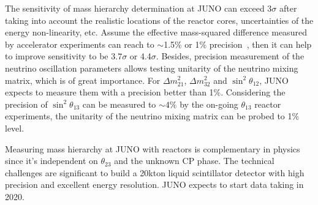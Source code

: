 The sensitivity of mass hierarchy determination at JUNO can exceed 3$\sigma$ after taking into account the realistic locations of the reactor cores, uncertainties of the energy non-linearity, etc. Assume the effective mass-squared difference measured by accelerator experiments can reach to $\sim$1.5\% or 1\% precision~\cite{Agarwalla}, then it can help to improve sensitivity to be 3.7$\sigma$ or 4.4$\sigma$\cite{Li-PRD13}. Besides, precision measurement of the neutrino oscillation parameters allows testing unitarity of the neutrino mixing matrix, which is of great importance. For $\Delta m^2_{21}$, $\Delta m^2_{32}$ and $\sin^2\theta_{12}$, JUNO expects to measure them with a precision better than 1\%. Considering the precision of $\sin^2\theta_{13}$ can be measured to $\sim4\%$ by the on-going $\theta_{13}$ reactor experiments, the unitarity of the neutrino mixing matrix can be probed to 1\% level.

Measuring mass hierarchy at JUNO with reactors is complementary in physics since it's independent on $\theta_{23}$ and the unknown CP phase. The technical challenges are significant to build a 20kton liquid scintillator detector with high precision and excellent energy resolution. JUNO expects to start data taking in 2020.

